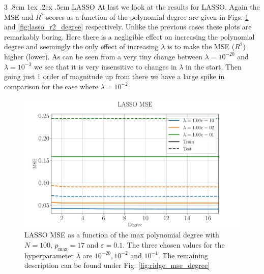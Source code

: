 \documentclass[%
reprint,
amsmath,amssymb,
aps,
pra,
]{revtex4-2}
\makeatletter
\renewcommand{\subsubsection}{%
	\@startsection
	{subsubsection}%
	{3}%
	{\z@}%
	{.8cm \@plus1ex \@minus .2ex}%
	{.5cm}%
	{\normalfont\small\centering}%
}
\makeatother
\begin{document}
\subsubsection{LASSO}
At last we look at the results for LASSO. Again the MSE and $R^2$-scores as a function of the polynomial degree are given in Figs. \ref{fig:lasso_mse_degree} and \ref{fig:lasso_r2_degree} respectively. Unlike the previous cases these plots are remarkably boring. Here there is a negligible effect on increasing the polynomial degree and seemingly the only effect of increasing $\lambda$ is to make the MSE ($R^2$) higher (lower). As can be seen from a very tiny change between $\lambda=10^{-20}$ and $\lambda=10^{-3}$ we see that it is very insensitive to changes in $\lambda$ in the start. Then going just 1 order of magnitude up from there we have a large spike in comparison for the case where $\lambda=10^{-2}$. 
\begin{figure}[ht!]
	\centering
	\includegraphics[width=\linewidth]{Python/Figures/LASSO/LASSO_MSE_no_scaling.pdf}
	\caption{LASSO MSE as a function of the max polynomial degree with \(N=100\), \(p_{\text{max}}=17\) and \(\varepsilon=0.1\). The three chosen values for the hyperparameter $\lambda$ are $10^{-20},10^{-2}$ and $10^{-1}$. The remaining description can be found under Fig. \ref{fig:ridge_mse_degree}}
	\label{fig:lasso_mse_degree}
\end{figure}
\end{document}
